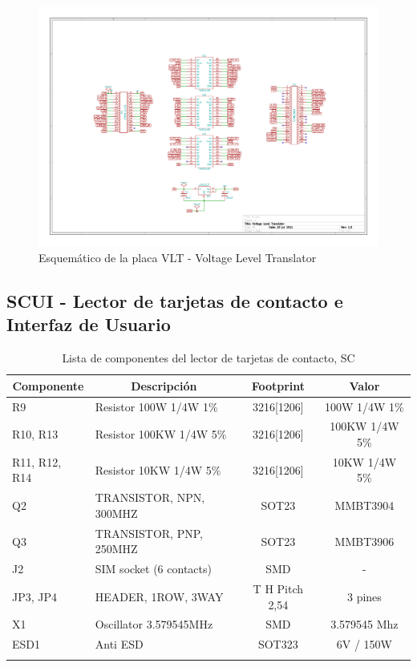 \begin{figure}[H]
\centering
  \begin{center}
  \includegraphics[angle=90]{Imagenes/vlt.jpg}
  \end{center}
  \caption{Esquemático de la placa VLT - Voltage Level Translator}\label{Fig:HW} 
\end{figure}

\subsection{SCUI - Lector de tarjetas de contacto e Interfaz de Usuario}
\begin{longtable}{|l|l|c|c|}
\hline
\multicolumn{1}{|c|}{\textbf{Componente}} & \multicolumn{1}{c|}{\textbf{Descripción}} & \textbf{ Footprint} & \textbf{Valor} \\ \hline
R9 & Resistor 100W 1/4W 1\%  & 3216[1206] & 100W 1/4W  1\% \\ \hline
R10, R13 & Resistor 100KW 1/4W 5\%  & 3216[1206] & 100KW 1/4W   5\% \\ \hline
R11, R12, R14 & Resistor 10KW 1/4W 5\%  & 3216[1206] & 10KW 1/4W   5\% \\ \hline
Q2 & TRANSISTOR, NPN, 300MHZ & SOT23 & MMBT3904 \\ \hline
Q3 & TRANSISTOR, PNP, 250MHZ & SOT23 & MMBT3906 \\ \hline
J2 & SIM socket (6 contacts) & SMD & - \\ \hline
JP3, JP4 & HEADER, 1ROW, 3WAY & T H Pitch 2,54 & 3 pines \\ \hline
X1 & Oscillator 3.579545MHz & SMD & 3.579545 Mhz \\ \hline
ESD1 & Anti ESD & SOT323 & 6V / 150W \\ \hline
\caption{Lista de componentes del lector de tarjetas de contacto, SC}
\label{}
\end{longtable}

